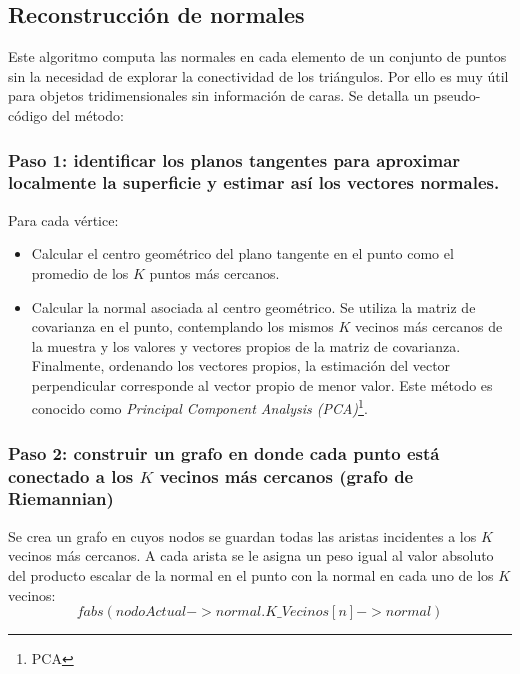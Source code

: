 \subsection{Reconstrucción de normales}

Este algoritmo computa las normales en cada elemento de un conjunto de puntos sin la necesidad de explorar la conectividad de los triángulos. Por ello es muy útil para objetos tridimensionales sin información de caras.
Se detalla un pseudo-código del método:


\subsubsection{Paso 1: identificar los planos tangentes para aproximar localmente la superficie y estimar así los vectores normales.}
Para cada vértice:
	\begin{itemize}
		\item Calcular el centro geométrico del plano tangente en el punto como el promedio de los $K$ puntos más cercanos.
		\item Calcular la normal asociada al centro geométrico. Se utiliza la matriz de covarianza en el punto, contemplando los mismos $K$ vecinos más cercanos de la muestra y los valores y vectores propios de la matriz de covarianza. Finalmente, ordenando los vectores propios, la estimación del vector perpendicular corresponde al vector propio de menor valor. Este método es conocido como \emph{Principal Component Analysis (PCA)}\footnote{PCA}.
	\end{itemize}

\subsubsection{Paso 2: construir un grafo en donde cada punto está conectado a los $K$ vecinos más cercanos (grafo de Riemannian)}
Se crea un grafo en cuyos nodos se guardan todas las aristas incidentes a los $K$ vecinos más cercanos. A cada arista se le asigna un peso igual al valor absoluto del producto escalar de la normal en el punto con la normal en cada uno de los $K$ vecinos:
   $$fabs(nodoActual->normal . K\_Vecinos[n]->normal)$$
